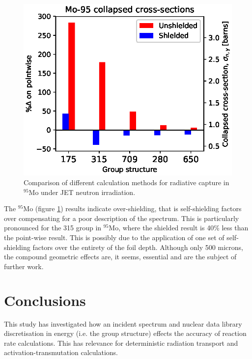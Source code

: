 
\begin{figure}[H]
  \centering
  \includegraphics[width=0.8\linewidth]{Mo-95.eps}
  \caption{Comparison of different calculation methods for radiative capture in $^{95}$Mo under JET neutron irradiation.}
  \label{fig:molybdenum-95}
\end{figure}

The $^{95}$Mo (figure \ref{fig:molybdenum-95}) results indicate over-shielding, that is self-shielding factors over compensating for a poor description of the spectrum. This is particularly pronounced for the 315 group in $^{95}$Mo, where the shielded result is 40\% less than the point-wise result. This is possibly due to the application of one set of self-shielding factors over the entirety of the foil depth. Although only 500 microns, the compound geometric effects are, it seems, essential and are the subject of further work. 

\section{Conclusions}
This study has investigated how an incident spectrum and nuclear data library discretisation in energy (i.e. the group structure) effects the accuracy of reaction rate calculations. This has relevance for deterministic radiation transport and activation-transmutation calculations.

